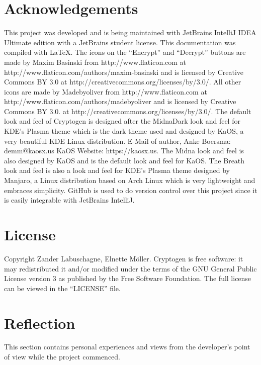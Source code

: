 \documentclass[11pt]{article}
\begin{document}
	\section{Acknowledgements}
	This project was developed and is being maintained with JetBrains IntelliJ IDEA Ultimate edition with a JetBrains student license. This documentation was compiled with \LaTeX. The icons on the ``Encrypt'' and ``Decrypt'' buttons are made by Maxim Basinski from http://www.flaticon.com at http://www.flaticon.com/authors/maxim-basinski and is licensed by Creative Commons BY 3.0 at http://creativecommons.org/licenses/by/3.0/. All other icons are made by Madebyoliver from http://www.flaticon.com at http://www.flaticon.com/authors/madebyoliver and is licensed by Creative Commons BY 3.0. at http://creativecommons.org/licenses/by/3.0/. The default look and feel of Cryptogen is designed after the MidnaDark look and feel for KDE's Plasma theme which is the dark theme used and designed by KaOS, a very beautiful KDE Linux distribution. E-Mail of author, Anke Boersma: demm@kaosx.us KaOS Website: https://kaosx.us. The Midna look and feel is also designed by KaOS and is the default look and feel for KaOS. The Breath look and feel is also a look and feel for KDE's Plasma theme designed by Manjaro, a Linux distribution based on Arch Linux which is very lightweight and embraces simplicity. GitHub is used to do version control over this project since it is easily integrable with JetBrains IntelliJ.

	\section{License}
	Copyright \textcopyright {} Zander Labuschagne, Elnette M\"oller. Cryptogen is free software: it may redistributed it and/or modified under the terms of the GNU General Public License version 3 as published by the Free Software Foundation. The full license can be viewed in the ``LICENSE'' file.

    \section{Reflection}
		This section contains personal experiences and views from the developer's point of view while the project commenced.\\
\end{document}
